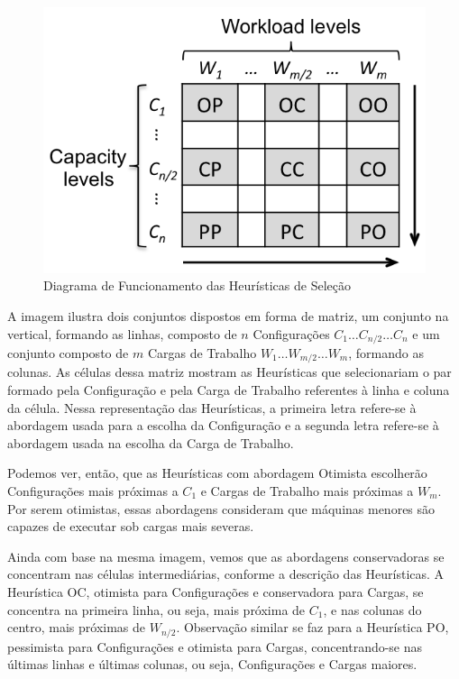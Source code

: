 \begin{figure}[hbt]
  \caption{\label{fig:heuristicas}Diagrama de Funcionamento das Heurísticas de Seleção}
  \begin{center}
    \includegraphics[scale=1]{img/heuristics}
  \end{center}
\end{figure}

A imagem ilustra dois conjuntos dispostos em forma de matriz, um conjunto 
na vertical, formando as linhas, composto de $n$ Configurações $C_1 \ldots C_{n/2} 
\ldots C_n$ e um conjunto composto de $m$ Cargas de Trabalho $W_1 \ldots W_{m/2} 
\ldots W_m$, formando as colunas. As células dessa matriz mostram as Heurísticas
que selecionariam o par formado pela Configuração e pela Carga de Trabalho referentes
à linha e coluna da célula. Nessa representação das Heurísticas, a primeira letra
refere-se à abordagem usada para a escolha da Configuração e a segunda letra refere-se 
à abordagem usada na escolha da Carga de Trabalho.
 
Podemos ver, então, que as Heurísticas com abordagem Otimista escolherão Configurações 
mais próximas a $C_1$ e Cargas de Trabalho mais próximas a $W_m$. Por serem otimistas, essas 
abordagens consideram que máquinas menores são capazes de executar sob cargas 
mais severas.

Ainda com base na mesma imagem, vemos que as abordagens conservadoras se concentram
nas células intermediárias, conforme a descrição das Heurísticas. A Heurística
OC, otimista para Configurações e conservadora para Cargas, se concentra na 
primeira linha, ou seja, mais próxima de $C_1$, e nas colunas do centro, mais
próximas de $W_{n/2}$. Observação similar se faz para a Heurística PO, pessimista 
para Configurações e otimista para Cargas, concentrando-se nas últimas linhas e 
últimas colunas, ou seja, Configurações e Cargas maiores.

